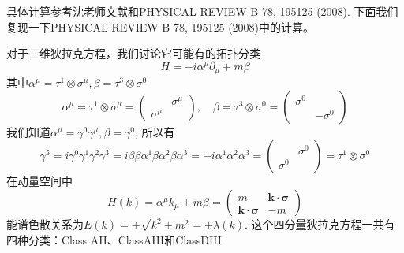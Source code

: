 \documentclass{article}
\numberwithin{equation}{subsection}
\begin{document}
具体计算参考沈老师文献和PHYSICAL REVIEW B 78, 195125 (2008). 下面我们复现一下PHYSICAL REVIEW B 78, 195125 (2008)中的计算。

对于三维狄拉克方程，我们讨论它可能有的拓扑分类
\begin{equation}
    H=-i\alpha^\mu \partial_\mu+m\beta
\end{equation}
其中$\alpha^\mu=\tau^1\otimes \sigma^\mu,\beta=\tau^3\otimes\sigma^0$
\begin{equation}
    \alpha^\mu=\tau^1\otimes\sigma^\mu=\begin{pmatrix}
        &\sigma^\mu\\
        \sigma^\mu&
    \end{pmatrix},\quad\beta=\tau^3\otimes\sigma^0=\begin{pmatrix}
        \sigma^0&\\
        &-\sigma^0
    \end{pmatrix}
\end{equation}
我们知道$\alpha^\mu=\gamma^0\gamma^\mu,\beta=\gamma^0$, 所以有
\begin{equation}
    \gamma^5=i\gamma^0\gamma^1\gamma^2\gamma^3=i\beta\beta\alpha^1\beta\alpha^2\beta\alpha^3=-i\alpha^1\alpha^2\alpha^3=\begin{pmatrix}
        &\sigma^0\\
        \sigma^0&
    \end{pmatrix}=\tau^1\otimes\sigma^0
\end{equation}
在动量空间中
\begin{equation}
    H(k)=\alpha^\mu k_\mu+m\beta=\begin{pmatrix}
        m&\mathbf{k}\cdot\bm{\sigma}\\
        \bm{k}\cdot\bm{\sigma}&-m
    \end{pmatrix}
\end{equation}
能谱色散关系为$E(k)=\pm\sqrt{k^2+m^2}=\pm \lambda(k)$. 这个四分量狄拉克方程一共有四种分类：Class AII、ClassAIII和ClassDIII
\end{document}
